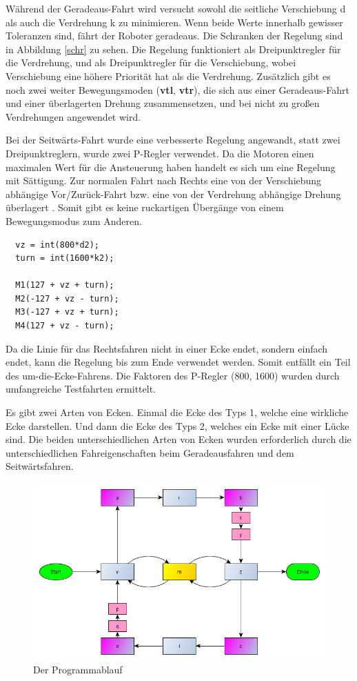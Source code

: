 \documentclass[a4paper,bibtotoc,oneside]{scrbook}
\begin{document}
Während der Geradeaus-Fahrt wird versucht sowohl die seitliche Verschiebung d als auch die Verdrehung k zu minimieren. Wenn beide Werte innerhalb gewisser Toleranzen sind, fährt der Roboter geradeaus. Die Schranken der Regelung sind in Abbildung \ref{schr} zu sehen. Die Regelung funktioniert als Dreipunktregler für die Verdrehung, und als Dreipunktregler für die Verschiebung, wobei Verschiebung eine höhere Priorität hat als die Verdrehung. Zusätzlich gibt es noch zwei weiter Bewegungsmoden (\textbf{vtl}, \textbf{vtr}), die sich aus einer Geradeaus-Fahrt und einer überlagerten Drehung zusammensetzen, und bei nicht zu großen Verdrehungen angewendet wird.

Bei der Seitwärts-Fahrt wurde eine verbesserte Regelung angewandt, statt zwei Dreipunktreglern, wurde zwei P-Regler verwendet. Da die Motoren einen maximalen Wert für die Ansteuerung haben handelt es sich um eine Regelung mit Sättigung. Zur normalen Fahrt nach Rechts eine von der Verschiebung abhängige Vor/Zurück-Fahrt bzw. eine von der Verdrehung abhängige Drehung überlagert . Somit gibt es keine ruckartigen Übergänge von einem Bewegungsmodus zum Anderen.

\begin{verbatim}
  vz = int(800*d2);
  turn = int(1600*k2);

  M1(127 + vz + turn);
  M2(-127 + vz - turn);
  M3(-127 + vz + turn);
  M4(127 + vz - turn); 
\end{verbatim}

Da die Linie für das Rechtsfahren nicht in einer Ecke endet, sondern einfach endet, kann die Regelung bis zum Ende verwendet werden. Somit entfällt ein Teil des um-die-Ecke-Fahrens. Die Faktoren des P-Regler (800, 1600) wurden durch umfangreiche Testfahrten ermittelt.

Es gibt zwei Arten von Ecken. Einmal die Ecke des Typs 1, welche eine wirkliche Ecke darstellen. Und dann die Ecke des Typs 2, welches ein Ecke mit einer Lücke sind.
Die beiden unterschiedlichen Arten von Ecken wurden erforderlich durch die unterschiedlichen Fahreigenschaften beim Geradeausfahren und dem Seitwärtsfahren.



\begin{figure}[htbp]
\centering
\includegraphics[width=150mm]{img/ablauf2.png}
\caption{Der Programmablauf}\label{abl}
\end{figure}
\end{document}
